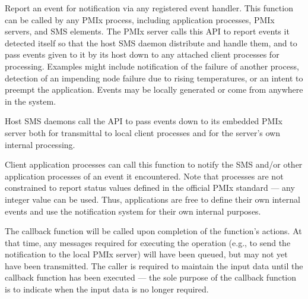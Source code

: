 
\reqattrend

\descr

Report an event for notification via any registered event handler. This function can be called by any \ac{PMIx} process, including application processes, \ac{PMIx} servers, and \ac{SMS} elements. The \ac{PMIx} server calls this \ac{API} to report events it detected itself so that the host \ac{SMS} daemon distribute and handle them, and to pass events given to it by its host down to any attached client processes for processing. Examples might include notification of the failure of another process, detection of an impending node failure due to rising temperatures, or an intent to preempt the application. Events may be locally generated or come from anywhere in the system.

Host \ac{SMS} daemons call the API to pass events down to its embedded \ac{PMIx} server both for transmittal to local client processes and for the server's own internal processing.

Client application processes can call this function to notify the \ac{SMS} and/or other application processes of an event it encountered. Note that processes are not constrained to report status values defined in the official \ac{PMIx} standard --- any integer value can be used. Thus, applications are free to define their own internal events and use the notification system for their own internal purposes.

\adviceuserstart
The callback function will be called upon completion of the
 function's actions. At that time, any messages required for executing the operation (e.g., to send the notification to the local \ac{PMIx} server) will
have been queued, but may not yet have been transmitted. The caller is required to maintain the input
data until the callback function has been executed --- the sole purpose of the callback function is to indicate when the input data is no longer required.
\adviceuserend


